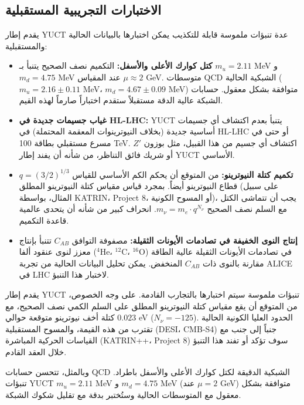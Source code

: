\documentclass[11pt,a4paper]{article}
\begin{document}
	\subsection{الاختبارات التجريبية المستقبلية}
	
	يقدم إطار YUCT عدة تنبؤات ملموسة قابلة للتكذيب يمكن اختبارها بالبيانات الحالية والمستقبلية:
	
	\begin{itemize}
		\item \textbf{كتل كوارك الأعلى والأسفل:} التكميم نصف الصحيح يتنبأ بـ $m_u = 2.11$ MeV و $m_d = 4.75$ MeV عند المقياس $\mu \approx 2$ GeV. متوسطات QCD الشبكية الحالية \cite{PDG2024} ($m_u = 2.16 \pm 0.11$ MeV، $m_d = 4.67 \pm 0.09$ MeV) متوافقة بشكل معقول. حسابات الشبكة عالية الدقة مستقبلاً ستقدم اختباراً صارماً لهذه القيم.
		
		\item \textbf{غياب جسيمات جديدة في HL-LHC:} YUCT يتنبأ بعدم اكتشاف أي جسيمات أساسية جديدة (بخلاف النيوترينوات المعقمة المحتملة) في HL-LHC أو حتى في مسرع مستقبلي بطاقة 100 TeV. اكتشاف أي جسيم من هذا القبيل، مثل بوزون $Z'$ أو شريك فائق التناظر، من شأنه أن يفند إطار YUCT الأساسي.
		
		\item \textbf{تكميم كتلة النيوترينو:} من المتوقع أن يحكم الكم الأساسي للقياس $q = (3/2)^{1/3}$ قطاع النيوترينو أيضاً. بمجرد قياس مقياس كتلة النيوترينو المطلق (على سبيل المثال، بواسطة KATRIN، Project 8، أو المسوح الكونية)، يجب أن تتماشى الكتل مع السلم نصف الصحيح $m_\nu = m_e \cdot q^{N_\nu}$. انحراف كبير من شأنه أن يتحدى عالمية قاعدة التكميم.
		
		\item \textbf{إنتاج النوى الخفيفة في تصادمات الأيونات الثقيلة:} مصفوفة التوافق $C_{AB}$ تتنبأ بإنتاج معزز لنوى عنقود ألفا ($^4$He، $^{12}$C، $^{16}$O) في تصادمات الأيونات الثقيلة عالية الطاقة مقارنة بالنوى ذات $C_{AB}$ المنخفض. يمكن تحليل البيانات الحالية من تجربة ALICE في LHC لاختبار هذا التنبؤ.
	\end{itemize}
	
	يقدم إطار YUCT تنبؤات ملموسة سيتم اختبارها بالتجارب القادمة. على وجه الخصوص، من المتوقع أن يقع مقياس كتلة النيوترينو المطلق على السلم الكمي نصف الصحيح، مع كتلة أخف نيوترينو متوقعة حوالي $0.023$ eV ($N_\nu = -125$). الحدود العليا الكونية الحالية تقترب من هذه القيمة، والمسوح المستقبلية (DESI، CMB‑S4) جنباً إلى جنب مع القياسات الحركية المباشرة (KATRIN++، Project 8) سوف تؤكد أو تفند هذا التنبؤ خلال العقد القادم.
	
	وبالمثل، تتحسن حسابات QCD الشبكية الدقيقة لكتل كوارك الأعلى والأسفل باطراد. تنبؤات YUCT $m_u = 2.11$ MeV و $m_d = 4.75$ MeV (عند $\mu = 2$ GeV) متوافقة بشكل معقول مع المتوسطات الحالية وستُختبر بدقة مع تقليل شكوك الشبكة.
	
\end{document}
